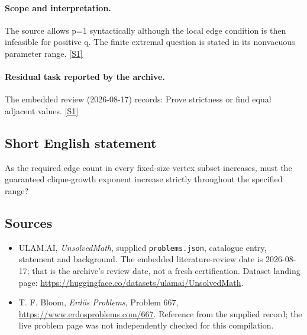 \documentclass[11pt,a4paper]{article}
\newcommand{\sref}[2]{\hyperlink{source:#1:#2}{[S#2]}}
\begin{document}
\paragraph{Scope and interpretation.}

The source allows p=1 syntactically although the local edge condition is then infeasible for positive q. The finite extremal question is stated in its nonvacuous parameter range. \sref{statement}{1}

\paragraph{Residual task reported by the archive.}

The embedded review (2026-08-17) records: Prove strictness or find equal adjacent values. \sref{statement}{1}

\subsection{Short English statement}

As the required edge count in every fixed-size vertex subset increases, must the guaranteed clique-growth exponent increase strictly throughout the specified range?

\subsection{Sources}

{\small

\begin{itemize}

\item[\hypertarget{source:statement:1}{S1}] ULAM.AI, \emph{UnsolvedMath}, supplied \texttt{problems.json}, catalogue entry, statement and background. The embedded literature-review date is 2026-08-17; that is the archive’s review date, not a fresh certification. Dataset landing page: \url{https://huggingface.co/datasets/ulamai/UnsolvedMath}.

\item[\hypertarget{source:statement:2}{S2}] T. F. Bloom, \emph{Erdős Problems}, Problem 667, \url{https://www.erdosproblems.com/667}. Reference from the supplied record; the live problem page was not independently checked for this compilation.

\end{itemize}

}

\label{end:statement}
\end{document}
